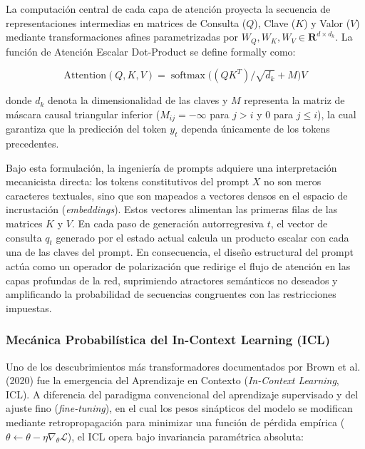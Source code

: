La computación central de cada capa de atención proyecta la secuencia de representaciones intermedias en matrices de Consulta ($Q$), Clave ($K$) y Valor ($V$) mediante transformaciones afines parametrizadas por $W_Q, W_K, W_V \in \mathbf{R}^{d \times d_k}$. La función de Atención Escalar Dot-Product se define formally como:

\begin{equation}
\mathrm{Attention}(Q, K, V) = \operatorname{softmax}\bigl( (Q K^T) / \sqrt{d_k} + M \bigr) V
\end{equation}

donde $d_k$ denota la dimensionalidad de las claves y $M$ representa la matriz de máscara causal triangular inferior ($M_{ij} = -\infty$ para $j > i$ y $0$ para $j \le i$), la cual garantiza que la predicción del token $y_t$ dependa únicamente de los tokens precedentes.

Bajo esta formulación, la ingeniería de prompts adquiere una interpretación mecanicista directa: los tokens constitutivos del prompt $X$ no son meros caracteres textuales, sino que son mapeados a vectores densos en el espacio de incrustación (\textit{embeddings}). Estos vectores alimentan las primeras filas de las matrices $K$ y $V$. En cada paso de generación autorregresiva $t$, el vector de consulta $q_t$ generado por el estado actual calcula un producto escalar con cada una de las claves del prompt. En consecuencia, el diseño estructural del prompt actúa como un operador de polarización que redirige el flujo de atención en las capas profundas de la red, suprimiendo atractores semánticos no deseados y amplificando la probabilidad de secuencias congruentes con las restricciones impuestas.

\subsubsection{Mecánica Probabilística del In-Context Learning (ICL)}

Uno de los descubrimientos más transformadores documentados por Brown et al. (2020) fue la emergencia del Aprendizaje en Contexto (\textit{In-Context Learning}, ICL). A diferencia del paradigma convencional del aprendizaje supervisado y del ajuste fino (\textit{fine-tuning}), en el cual los pesos sinápticos del modelo se modifican mediante retropropagación para minimizar una función de pérdida empírica ($\theta \leftarrow \theta - \eta \nabla_\theta \mathcal{L}$), el ICL opera bajo invariancia paramétrica absoluta:

